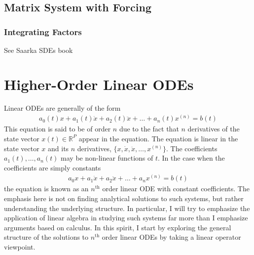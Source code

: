\documentclass[12pt]{article}
\newcommand{\R}{\mathbb{R}}
\begin{document}
\subsection{Matrix System with Forcing}
\subsubsection{Integrating Factors}
See Saarka SDEs book


\section{Higher-Order Linear ODEs}
Linear ODEs are generally of the form 
\begin{align}
a_0(t)x + a_1(t) \dot{x} + a_2(t) \ddot{x} + \dots + a_n(t) x^{(n)} = b(t) \label{linear_ODE}
\end{align}
This equation is said to be of order $n$ due to the fact that $n$ derivatives of the state vector $x(t) \in \R^P$ appear in the equation. 
The equation is linear in the state vector $x$ and its $n$ derivatives, $\{x, \dot{x}, \ddot{x}, \dots, x^{(n)}\}$. The coefficients 
$a_1(t), \dots, a_n(t)$ may be non-linear functions of $t$. In the case when the coefficients are simply constants 
\begin{align*}
a_0 x + a_1 \dot{x} + a_2 \ddot{x} + \dots + a_n x^{(n)} = b(t)
\end{align*}
the equation is known as an $n^{\text{th}}$ order linear ODE with constant coefficients. The emphasis here is not on finding analytical solutions 
to such systems, but rather understanding the underlying structure. In particular, I will try to emphasize the application of linear algebra in studying 
such systems far more than I emphasize arguments based on calculus. In this spirit, I start by exploring the general structure of the solutions to 
$n^{\text{th}}$ order linear ODEs by taking a linear operator viewpoint. 
\end{document}
